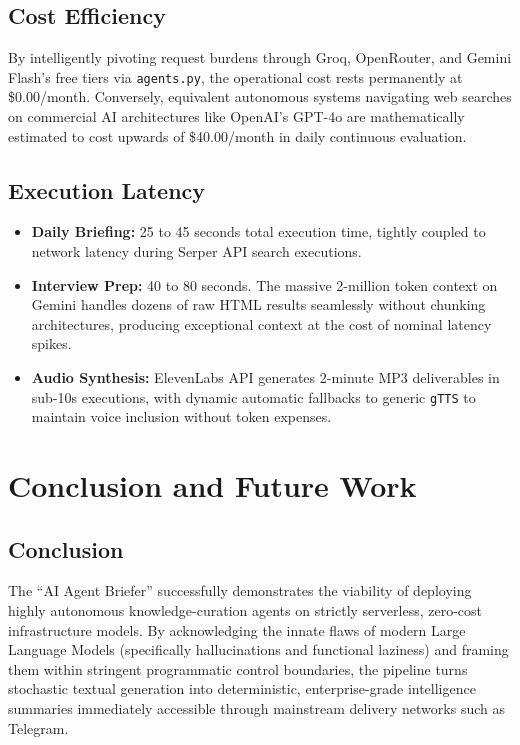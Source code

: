 \documentclass[conference]{IEEEtran}
\begin{document}
\subsection{Cost Efficiency}
By intelligently pivoting request burdens through Groq, OpenRouter, and Gemini Flash's free tiers via \texttt{agents.py}, the operational cost rests permanently at \$0.00/month. Conversely, equivalent autonomous systems navigating web searches on commercial AI architectures like OpenAI's GPT-4o are mathematically estimated to cost upwards of \$40.00/month in daily continuous evaluation.

\subsection{Execution Latency}
\begin{itemize}
    \item \textbf{Daily Briefing:} 25 to 45 seconds total execution time, tightly coupled to network latency during Serper API search executions.
    \item \textbf{Interview Prep:} 40 to 80 seconds. The massive 2-million token context on Gemini handles dozens of raw HTML results seamlessly without chunking architectures, producing exceptional context at the cost of nominal latency spikes.
    \item \textbf{Audio Synthesis:} ElevenLabs API generates 2-minute MP3 deliverables in sub-10s executions, with dynamic automatic fallbacks to generic \texttt{gTTS} to maintain voice inclusion without token expenses.
\end{itemize}

\section{Conclusion and Future Work}

\subsection{Conclusion}
The ``AI Agent Briefer'' successfully demonstrates the viability of deploying highly autonomous knowledge-curation agents on strictly serverless, zero-cost infrastructure models. By acknowledging the innate flaws of modern Large Language Models (specifically hallucinations and functional laziness) and framing them within stringent programmatic control boundaries, the pipeline turns stochastic textual generation into deterministic, enterprise-grade intelligence summaries immediately accessible through mainstream delivery networks such as Telegram.
\end{document}
